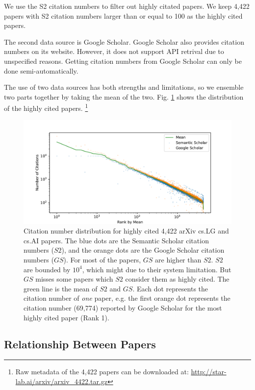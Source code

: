 We use the S2 citation numbers to filter out highly citated papers.
We keep 4,422 papers with S2 citation numbers larger than or equal to 100 as the highly cited papers.

The second data source is Google Scholar.
Google Scholar also provides citation numbers on its website.
However, it does not support API retrival due to unspecified reasons.
Getting citation numbers from Google Scholar can only be done semi-automatically.

The use of two data sources has both strengths and limitations,
so we ensemble two parts together by taking the mean of the two.
Fig. \ref{fig:distribution} shows the distribution of the highly cited papers.
\footnote{Raw metadata of the 4,422 papers can be downloaded at: \url{http://star-lab.ai/arxiv/arxiv_4422.tar.gz}}

\begin{figure}
    \centering
    \includegraphics[width=\textwidth]{images/citation_number_distribution.pdf}
    \caption{Citation number distribution for highly cited 4,422 arXiv cs.LG and cs.AI papers.
        The blue dots are the Semantic Scholar citation numbers ($S2$),
        and the orange dots are the Google Scholar citation numbers ($GS$).
        For most of the papers, $GS$ are higher than $S2$.
        $S2$ are bounded by $10^4$, which might due to their system limitation.
        But $GS$ misses some papers which $S2$ consider them as highly cited.
        The green line is the mean of $S2$ and $GS$.
        Each dot represents the citation number of \emph{one} paper, 
        e.g. the first orange dot represents the citation number (69,774) reported by Google Scholar for the most highly cited paper (Rank 1).
    }
    \label{fig:distribution}
\end{figure}

\subsection{Relationship Between Papers}

